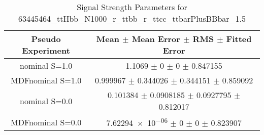 \begin{table}
\centering
\caption{Signal Strength Parameters for 63445464\_ttHbb\_N1000\_r\_ttbb\_r\_ttcc\_ttbarPlusBBbar\_1.5}
\begin{tabular}{cc}
\toprule
Pseudo Experiment & Mean $\pm$ Mean Error $\pm$ RMS $\pm$ Fitted Error\\
\midrule
nominal S=1.0 & \num{1.1069} $\pm$ \num{0} $\pm$ \num{0} $\pm$ \num{0.847155}\\
MDFnominal S=1.0 & \num{0.999967} $\pm$ \num{0.344026} $\pm$ \num{0.344151} $\pm$ \num{0.859092}\\
nominal S=0.0 & \num{0.101384} $\pm$ \num{0.0908185} $\pm$ \num{0.0927795} $\pm$ \num{0.812017}\\
MDFnominal S=0.0 & \num{7.62294e-06} $\pm$ \num{0} $\pm$ \num{0} $\pm$ \num{0.823907}\\
\bottomrule
\end{tabular}
\end{table}